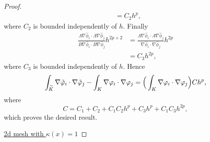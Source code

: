 \documentclass[10pt]{article}
\begin{document}
\begin{proof}
\begin{equation}
\begin{aligned}
		&= C_2 h^p,
	\end{aligned}
	\end{equation}
	where $C_2$ is bounded independently of $h$. Finally
	\begin{equation}
	\begin{aligned}
		\frac{\Lambda \nabla \hat \phi_i \cdot \Lambda \nabla \hat \phi_j}{B \nabla \hat \phi_i \cdot B \nabla \hat \phi_j}h^{2p+2} 
		&= \frac{\Lambda \nabla \hat \phi_i \cdot \Lambda \nabla \hat \phi_j}{\nabla \hat \phi_i \cdot \nabla \hat \phi_j}h^{2p} \\
		&= C_3 h^{2p},
	\end{aligned}
	\end{equation}
	where $C_3$ is bounded independently of $h$. Hence
	\begin{equation}
		\int_{\widetilde K} \nabla \tilde {\varphi}_i \cdot \nabla \tilde {\varphi}_j - \int_K \nabla \varphi_i \cdot \nabla \varphi_j = \Big(\int_K \nabla \varphi_i \cdot \nabla \varphi_j\Big) C h^p,
	\end{equation}
	where 
	\begin{equation}
		C = C_1 + C_2 + C_1C_2h^p + C_3h^p + C_1C_3h^{2p},
	\end{equation}
	which proves the desired result.	
	
	\underline{2d mesh with $\kappa(x) = 1$}
	

\end{proof}
\end{document}
